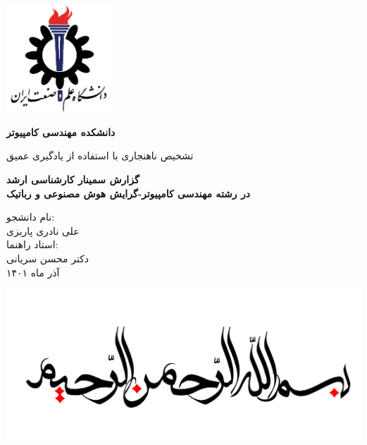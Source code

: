 \documentclass[12pt,a4paper]{report}
\begin{document}
	\thispagestyle{empty}
	\vspace*{25mm}
	\centerline{\includegraphics[height=4cm]{./images/logos/iust.png}}

	\begin{center}
	\textbf{
		دانشکده مهندسی کامپیوتر
	}
	\\[1cm]
	\baselineskip=2cm
	{\titr
	\begin{Huge}
	تشخیص ناهنجاری با استفاده از یادگیری عمیق\\[1cm]
	\end{Huge}}
	{\Large 
		\textbf{
			گزارش سمینار کارشناسی ارشد\\
			در رشته مهندسی کامپیوتر-گرایش هوش مصنوعی و رباتیک
		} \\[1cm]
	}

	{\Large { 
	نام دانشجو:
	}
	\\
	{\Large  علی نادری پاریزی }
	\\[.5cm]
	{\Large  
		استاد راهنما:
	}
	\\
	{\Large دکتر محسن سریانی}
	\\[.6cm]
	}
	آذر ماه ۱۴۰۱
	\end{center}

	\newpage
		\begin{center}
		\includegraphics[width=\linewidth]{./images/logos/in-the-name-of-god.jpg}
		\end{center}
	\newpage
	
	
\end{document}
